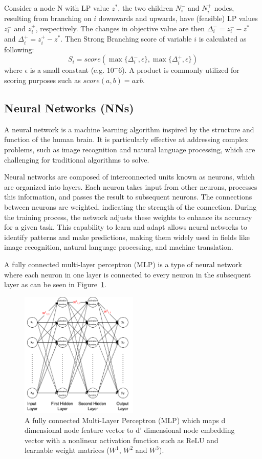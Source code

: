 Consider a node N with LP value $z^*$, the two children $N_i^-$ and $N_i^+$ nodes, resulting from branching on $i$ downwards and upwards, have (feasible) LP values $z_i^-$ and $z_i^+$, respectively.
The changes in objective value are then $\Delta_i^- = z_i^- - z^* $  and $\Delta_i^+ = z_i^+ - z^* $.
Then Strong Branching score of variable $i$ is calculated as following: $$S_i = score (\max \{\Delta_i^-, \epsilon\}, \max \{\Delta_i^+, \epsilon\}) $$
where $\epsilon$ is a small constant (e.g. $10^-6$). A product is commonly utilized for scoring purposes such as $score(a, b) = a x b$.


\subsection{Neural Networks (NNs)}\label{subsec:neural-networks-(nns)}
A neural network is a machine learning algorithm inspired by the structure and function of the human brain.
It is particularly effective at addressing complex problems, such as image recognition and natural language processing, which are challenging for traditional algorithms to solve.


Neural networks are composed of interconnected units known as neurons, which are organized into layers.
Each neuron takes input from other neurons, processes this information, and passes the result to subsequent neurons.
The connections between neurons are weighted, indicating the strength of the connection.
During the training process, the network adjusts these weights to enhance its accuracy for a given task.
This capability to learn and adapt allows neural networks to identify patterns and make predictions, making them widely used in fields like image recognition, natural language processing, and machine translation.


A fully connected multi-layer perceptron (MLP) is a type of neural network where each neuron in one layer is connected to every neuron in the subsequent layer as can be seen in Figure~\ref{fig:mlp}.

\begin{figure}[htb!]
    \centering
    \includegraphics[width=0.5\textwidth]{figures/MLP}
    \caption{A fully connected Multi-Layer Perceptron (MLP) which maps d dimensional node feature vector to d’ dimensional node embedding vector with a nonlinear activation function such as ReLU and learnable weight matrices ($W^1$, $W^2$ and $W^3$).}
    \label{fig:mlp}
\end{figure}


